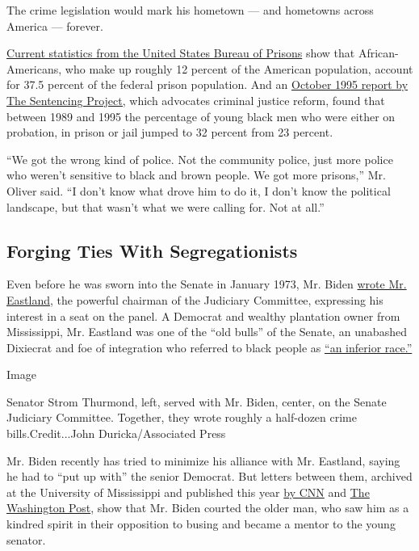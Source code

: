 The crime legislation would mark his hometown --- and hometowns across
America --- forever.

\href{https://www.bop.gov/about/statistics/statistics_inmate_race.jsp}{Current
statistics from the United States Bureau of Prisons} show that
African-Americans, who make up roughly 12 percent of the American
population, account for 37.5 percent of the federal prison population.
And an
\href{https://www.sentencingproject.org/wp-content/uploads/2016/01/Young-Black-Americans-and-the-Criminal-Justice-System-Five-Years-Later.pdf}{October
1995 report by The Sentencing Project,} which advocates criminal justice
reform, found that between 1989 and 1995 the percentage of young black
men who were either on probation, in prison or jail jumped to 32 percent
from 23 percent.

``We got the wrong kind of police. Not the community police, just more
police who weren't sensitive to black and brown people. We got more
prisons,'' Mr. Oliver said. ``I don't know what drove him to do it, I
don't know the political landscape, but that wasn't what we were calling
for. Not at all.''

\hypertarget{forging-ties-with-segregationists}{%
\subsection{Forging Ties With
Segregationists}\label{forging-ties-with-segregationists}}

Even before he was sworn into the Senate in January 1973, Mr. Biden
\href{https://int.graylady3jvrrxbe.onion/data/documenthelper/1332-letter-from-biden-to-eastland/02c8ce49f0cfce13912f/optimized/full.pdf\#page=1}{wrote
Mr. Eastland}, the powerful chairman of the Judiciary Committee,
expressing his interest in a seat on the panel. A Democrat and wealthy
plantation owner from Mississippi, Mr. Eastland was one of the ``old
bulls'' of the Senate, an unabashed Dixiecrat and foe of integration who
referred to black people as
\href{https://www.nytimes3xbfgragh.onion/1986/02/20/obituaries/james-o-eastland-is-dead-at-81-leading-senate-foe-of-integration.html}{``an
inferior race.''}

Image

Senator Strom Thurmond, left, served with Mr. Biden, center, on the
Senate Judiciary Committee. Together, they wrote roughly a half-dozen
crime bills.Credit...John Duricka/Associated Press

Mr. Biden recently has tried to minimize his alliance with Mr. Eastland,
saying he had to ``put up with'' the senior Democrat. But letters
between them, archived at the University of Mississippi and published
this year
\href{https://www.cnn.com/2019/04/11/politics/joe-biden-busing-letters-2020/index.html}{by
CNN} and
\href{https://www.washingtonpost.com/context/joe-biden-s-letters-to-segregationist-sen-james-o-eastland/705b015f-bd0a-4d7d-84e5-88960d5667a7/?utm_term=.48cf44eb6123}{The
Washington Post}, show that Mr. Biden courted the older man, who saw him
as a kindred spirit in their opposition to busing and became a mentor to
the young senator.

